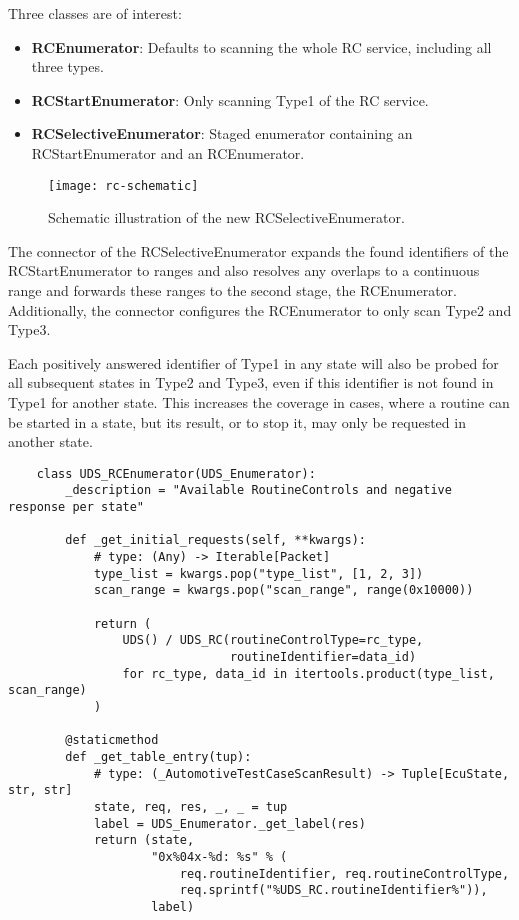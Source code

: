 Three classes are of interest:

\begin{itemize}
    \item \textbf{RCEnumerator}: Defaults to scanning the whole RC service, including all three types.
    \item \textbf{RCStartEnumerator}: Only scanning Type1 of the RC service.
    \item \textbf{RCSelectiveEnumerator}: Staged enumerator containing an RCStartEnumerator and an RCEnumerator.
\end{itemize}

\begin{figure}[h]
    \centering
    \texttt{[image: rc-schematic]}
    \caption{Schematic illustration of the new RCSelectiveEnumerator.}
    \label{fig:rc-schematic}
\end{figure}

The connector of the RCSelectiveEnumerator expands the found identifiers of the RCStartEnumerator to ranges and also resolves any overlaps to a continuous range and forwards these ranges to the second stage, the RCEnumerator. Additionally, the connector configures the RCEnumerator to only scan Type2 and Type3.

Each positively answered identifier of Type1 in any state will also be probed for all subsequent states in Type2 and Type3, even if this identifier is not found in Type1 for another state. This increases the coverage in cases, where a routine can be started in a state, but its result, or to stop it, may only be requested in another state.

\begin{verbatim}
    class UDS_RCEnumerator(UDS_Enumerator):
        _description = "Available RoutineControls and negative response per state"
    
        def _get_initial_requests(self, **kwargs):
            # type: (Any) -> Iterable[Packet]
            type_list = kwargs.pop("type_list", [1, 2, 3])
            scan_range = kwargs.pop("scan_range", range(0x10000))
    
            return (
                UDS() / UDS_RC(routineControlType=rc_type,
                               routineIdentifier=data_id)
                for rc_type, data_id in itertools.product(type_list, scan_range)
            )
    
        @staticmethod
        def _get_table_entry(tup):
            # type: (_AutomotiveTestCaseScanResult) -> Tuple[EcuState, str, str]
            state, req, res, _, _ = tup
            label = UDS_Enumerator._get_label(res)
            return (state,
                    "0x%04x-%d: %s" % (
                        req.routineIdentifier, req.routineControlType,
                        req.sprintf("%UDS_RC.routineIdentifier%")),
                    label)
\end{verbatim}

